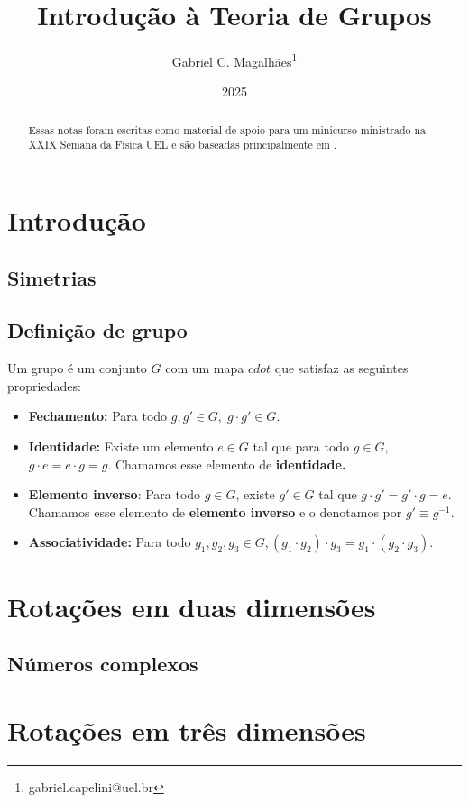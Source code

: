 \documentclass{article}
\title{Introdução à Teoria de Grupos}
\author{Gabriel C. Magalhães\footnote{gabriel.capelini@uel.br}}
\date{2025}
\begin{document}
\maketitle

\begin{abstract}
Essas notas foram escritas como material de apoio para um minicurso ministrado na XXIX Semana da Física UEL e são baseadas principalmente em \cite{jakob}. 
\end{abstract}

\tableofcontents
\pagebreak

\section{Introdução}
\subsection{Simetrias}

\subsection{Definição de grupo}
Um grupo é um conjunto $G$ com um mapa $cdot$ que satisfaz as seguintes propriedades:  
\begin{itemize}
	\item \textbf{Fechamento:} Para todo $g,g'\in G,\; g\cdot g'\in G.$ 
	\item \textbf{Identidade:} Existe um elemento $e\in G$ tal que para todo $g\in G$, $g\cdot e=e\cdot g = g$. Chamamos esse elemento de \textbf{identidade. }
	\item \textbf{Elemento inverso}: Para todo $g\in G$, existe $g'\in G$ tal que $g\cdot g'=g'\cdot g = e$. Chamamos esse elemento de \textbf{elemento inverso} e o denotamos por $g'\equiv g^{-1}$. 
	\item \textbf{Associatividade:} Para todo $g_1,g_2,g_3\in G,(g_1\cdot g_2)\cdot g_3=g_1\cdot(g_2\cdot g_3).$
\end{itemize}
\section{Rotações em duas dimensões}
\subsection{Números complexos}
\section{Rotações em três dimensões}
\end{document}
